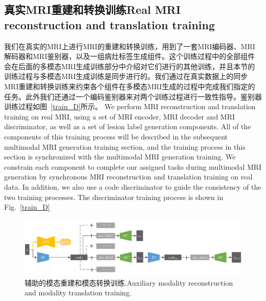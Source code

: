 \documentclass[letterpaper]{article} %
\begin{document}
\subsection{真实MRI重建和转换训练Real MRI reconstruction and translation training}
我们在真实的MRI上进行MRI的重建和转换训练，用到了一套MRI编码器、MRI解码器和MRI鉴别器，以及一组病灶标签生成组件。这个训练过程中的全部组件会在后面的多模态MRI生成训练部分中介绍对它们进行的其他训练，并且本节的训练过程与多模态MRI生成训练是同步进行的。我们通过在真实数据上的同步MRI重建和转换训练来约束各个组件在多模态MRI生成的过程中完成我们指定的任务。此外我们还通过一个编码鉴别器来对两个训练过程进行一致性指导。鉴别器训练过程如图~\ref{train_D}所示。
We perform MRI reconstruction and translation training on real MRI, using a set of MRI encoder, MRI decoder and MRI discriminator, as well as a set of lesion label generation components. All of the components of this training process will be described in the subsequent multimodal MRI generation training section, and the training process in this section is synchronized with the multimodal MRI generation training. We constrain each component to complete our assigned tasks during multimodal MRI generation by synchronous MRI reconstruction and translation training on real data. In addition, we also use a code discriminator to guide the consistency of the two training processes. The discriminator training process is shown in Fig.~\ref{train_D}

\begin{figure}
	\centering
	\includegraphics[width=0.98\columnwidth]{figures/trans_train}
	\caption{辅助的模态重建和模态转换训练.Auxiliary modality reconstruction and modality translation training.}
	\label{trans_train}
\end{figure}
\end{document}
